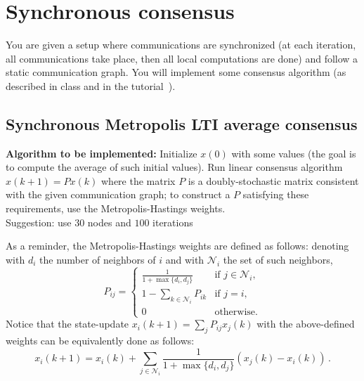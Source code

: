 \documentclass{article}
\newcommand{\mc}{\mathcal}
\begin{document}
\section{Synchronous consensus}
You are given a setup where communications are synchronized (at each iteration,
all communications take place, then all local computations are done) and follow a static communication graph.
You will implement some consensus algorithm (as described in class and in the tutorial~\cite{consensus-tutorial}).


\subsection{Synchronous Metropolis LTI average consensus}
\textbf{Algorithm to be implemented:}
Initialize $x(0)$ with some values (the goal is to compute the average of such initial values). Run linear consensus algorithm $x(k+1) = P x(k)$ where the matrix $P$ is a doubly-stochastic matrix consistent with the given communication graph; to construct a $P$ satisfying these requirements, use the Metropolis-Hastings weights. \\
Suggestion: use $30$ nodes and $100$ iterations

As a reminder, the Metropolis-Hastings weights are defined as follows:
denoting with $d_i$ the number of neighbors of $i$ and with $\mc N_i$ the set of such neighbors,
\[ P_{ij} =
\begin{cases}
\frac{1}{1+\max\{d_i, d_j \}} & \text{if $j \in \mc N_i$,}\\
1-\sum_{k \in \mc N_i} P_{ik} & \text{if $j = i$,}\\
0							  & \text{otherwise}.
\end{cases}
\]
Notice that the state-update $x_i(k+1) = \sum_j P_{ij} x_j(k)$ with the above-defined weights can be equivalently done as follows:
\[ x_i(k+1) = x_i(k) + \sum_{j \in \mc N_i} \frac{1}{1+\max\{d_i, d_j \}} (x_j(k) - x_i(k)) \,.\]
\end{document}
